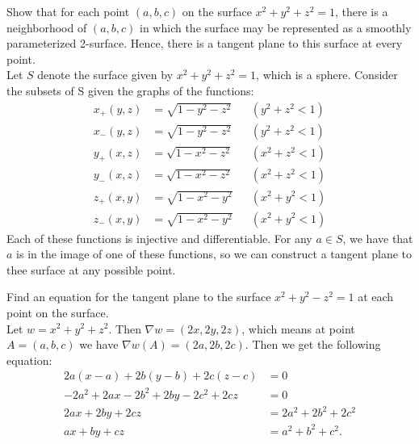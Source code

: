 \documentclass[12pt]{book}
\newenvironment{exercise}[2][Exercise]{\begin{trivlist}
\item[\hskip \labelsep {\bfseries #1}\hskip \labelsep {\bfseries #2.}]}{\end{trivlist}}
\begin{document}
\begin{exercise}{7.2.7}
\begin{exercise}{9.4.12}
    Show that for each point $(a,b,c)$ on the surface $x^2 + y^2 + z^2 =1$, there is a neighborhood of $(a,b,c)$ in which the surface may be represented as a smoothly parameterized 2-surface. Hence, there is a tangent plane to this surface at every point. \\

    Let $S$ denote the surface given by $x^2 + y^2 + z^2 =1$, which is a sphere. Consider the subsets of S given the graphs of the functions:
    \begin{align*}
        x_+ (y,z) &= \sqrt{ 1 - y^2 - z^2 } && (y^2 + z^2 < 1) \\
        x_- (y,z) &= \sqrt{ 1 - y^2 - z^2 } && (y^2 + z^2 < 1) \\
        y_+ (x,z) &= \sqrt{ 1 - x^2 - z^2 } && (x^2 + z^2 < 1) \\
        y_- (x,z) &= \sqrt{ 1 - x^2 - z^2 } && (x^2 + z^2 < 1) \\
        z_+ (x,y) &= \sqrt{ 1 - x^2 - y^2 } && (x^2 + y^2 < 1) \\
        z_- (x,y) &= \sqrt{ 1 - x^2 - y^2 } && (x^2 + y^2 < 1)
    \end{align*}
    Each of these functions is injective and differentiable. For any $a \in S$, we have that $a$ is in the image of one of these functions, so we can construct a tangent plane to thee surface at any possible point.
\end{exercise}

\begin{exercise}{9.4.13}
    Find an equation for the tangent plane to the surface $x^2 + y^2 -z^2 = 1$ at each point on the surface.  \\

    Let $w = x^2 + y^2 + z^2 $. Then $\nabla w = \left( 2x, 2y, 2z \right)$, which means at point $A = (a,b,c)$ we have $\nabla w(A) = \left( 2a, 2b, 2c \right)$. Then we get the following equation:
    \begin{align*}
    2 a (x -a ) + 2b (y-b) + 2c (z -c ) &= 0\\
    -2 a^2 + 2 ax - 2b^2 + 2 by - 2c^2 + 2 cz &= 0  \\
    2 ax + 2 by + 2cz &= 2 a^2 + 2 b^2 + 2c^2 \\
    ax + by + cz &= a^2 + b^2 + c^2 .
    \end{align*}
\end{exercise}





\end{exercise}
\end{document}
